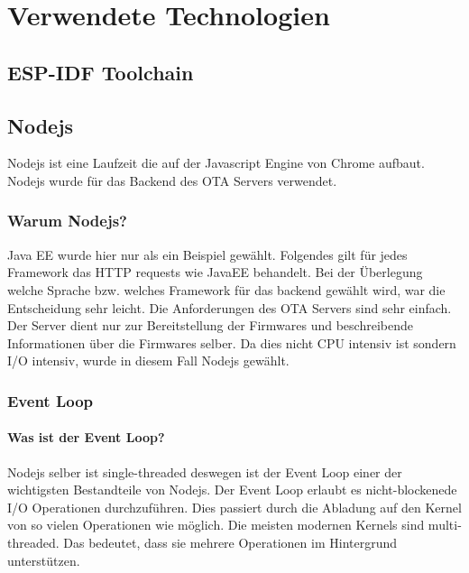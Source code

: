\chapter{Verwendete Technologien}\label{cha:used-technologies}

\section{ESP-IDF Toolchain}\label{sec:esp-idf-toolchain}


\section{Nodejs}\label{sec:nodejs}

Nodejs ist eine Laufzeit die auf der Javascript Engine von Chrome aufbaut. Nodejs wurde für das Backend des OTA Servers verwendet.

\subsection{Warum Nodejs?}

Java EE wurde hier nur als ein Beispiel gewählt. Folgendes gilt für jedes Framework das HTTP requests wie JavaEE behandelt. 
Bei der Überlegung welche Sprache bzw. welches Framework für das backend gewählt wird, war die Entscheidung sehr leicht.
Die Anforderungen des OTA Servers sind sehr einfach. Der Server dient nur zur Bereitstellung der Firmwares und beschreibende Informationen über die Firmwares selber.
Da dies nicht CPU intensiv ist sondern I/O intensiv, wurde in diesem Fall Nodejs gewählt.

\subsection{Event Loop}

\subsubsection{Was ist der Event Loop?}

Nodejs selber ist single-threaded deswegen ist der Event Loop einer der wichtigsten Bestandteile von Nodejs.
Der Event Loop erlaubt es nicht-blockenede I/O Operationen durchzuführen. Dies passiert durch die Abladung auf den Kernel von so vielen Operationen wie möglich.
\newline
\newline
Die meisten modernen Kernels sind multi-threaded. Das bedeutet, dass sie mehrere Operationen im Hintergrund unterstützen.

